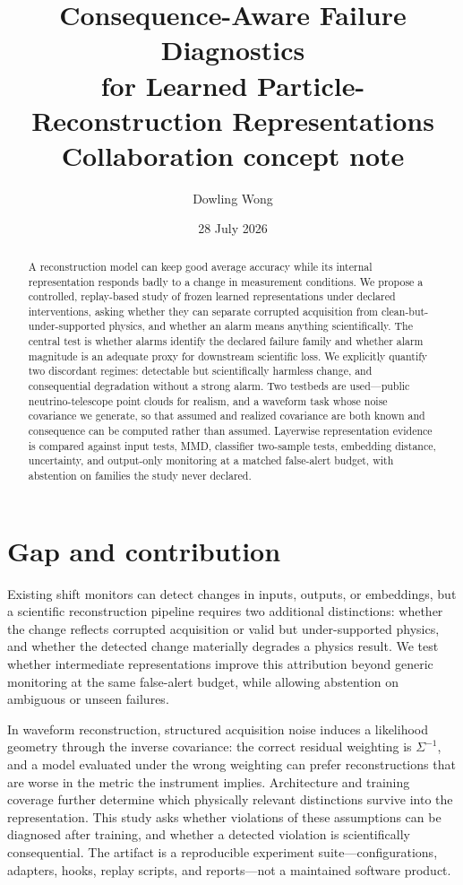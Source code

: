 \documentclass[10pt,twocolumn]{extarticle}
\title{\vspace{-1.55em}\textbf{Consequence-Aware Failure Diagnostics\\[-0.18em]
for Learned Particle-Reconstruction Representations}\\[-0.12em]
\normalsize Collaboration concept note}
\author{Dowling Wong}
\date{28 July 2026}
\begin{document}
\maketitle
\vspace{-1.9em}

\begin{abstract}
A reconstruction model can keep good average accuracy while its internal
representation responds badly to a change in measurement conditions. We propose
a controlled, replay-based study of frozen learned representations under
declared interventions, asking whether they can separate corrupted acquisition
from clean-but-under-supported physics, and whether an alarm means anything
scientifically. The central test is whether alarms identify the declared failure
family and whether alarm magnitude is an adequate proxy for downstream
scientific loss. We explicitly quantify two discordant regimes: detectable but
scientifically harmless change, and consequential degradation without a strong
alarm. Two testbeds are used---public neutrino-telescope point clouds for
realism, and a waveform task whose noise covariance we generate, so that
assumed and realized covariance are both known and consequence can be computed
rather than assumed. Layerwise representation evidence is compared against
input tests, MMD, classifier two-sample tests, embedding distance, uncertainty,
and output-only monitoring at a matched false-alert budget, with abstention on
families the study never declared.
\end{abstract}

\section{Gap and contribution}

Existing shift monitors can detect changes in inputs, outputs, or embeddings,
but a scientific reconstruction pipeline requires two additional distinctions:
whether the change reflects corrupted acquisition or valid but under-supported
physics, and whether the detected change materially degrades a physics result.
We test whether intermediate representations improve this attribution beyond
generic monitoring at the same false-alert budget, while allowing abstention on
ambiguous or unseen failures.

In waveform reconstruction, structured acquisition noise induces a likelihood
geometry through the inverse covariance: the correct residual weighting is
$\Sigma^{-1}$, and a model evaluated under the wrong weighting can prefer
reconstructions that are worse in the metric the instrument implies.
Architecture and training coverage further determine which physically relevant
distinctions survive into the representation. This study asks whether
violations of these assumptions can be diagnosed after training, and whether a
detected violation is scientifically consequential. The artifact is a
reproducible experiment suite---configurations, adapters, hooks, replay
scripts, and reports---not a maintained software product.
\end{document}
